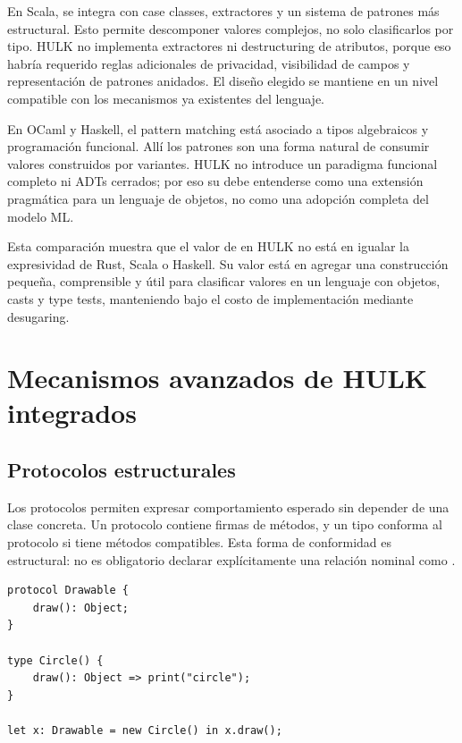 \documentclass[12pt,letterpaper]{article}
\newcommand{\repo}[1]{\texttt{\detokenize{#1}}}
\newcommand{\hulk}{\textsc{HULK}}
\begin{document}
En Scala, \repo{match} se integra con case classes, extractores y un sistema de patrones más estructural. Esto permite descomponer valores complejos, no solo clasificarlos por tipo. \hulk{} no implementa extractores ni destructuring de atributos, porque eso habría requerido reglas adicionales de privacidad, visibilidad de campos y representación de patrones anidados. El diseño elegido se mantiene en un nivel compatible con los mecanismos ya existentes del lenguaje.

En OCaml y Haskell, el pattern matching está asociado a tipos algebraicos y programación funcional. Allí los patrones son una forma natural de consumir valores construidos por variantes. \hulk{} no introduce un paradigma funcional completo ni ADTs cerrados; por eso su \repo{match} debe entenderse como una extensión pragmática para un lenguaje de objetos, no como una adopción completa del modelo ML.

Esta comparación muestra que el valor de \repo{match} en \hulk{} no está en igualar la expresividad de Rust, Scala o Haskell. Su valor está en agregar una construcción pequeña, comprensible y útil para clasificar valores en un lenguaje con objetos, casts y type tests, manteniendo bajo el costo de implementación mediante desugaring.

\section{Mecanismos avanzados de \hulk{} integrados}

\subsection{Protocolos estructurales}

Los protocolos permiten expresar comportamiento esperado sin depender de una clase concreta. Un protocolo contiene firmas de métodos, y un tipo conforma al protocolo si tiene métodos compatibles. Esta forma de conformidad es estructural: no es obligatorio declarar explícitamente una relación nominal como \repo{implements}.

\begin{lstlisting}[language=HULK,caption={Protocolo como contrato de comportamiento}]
protocol Drawable {
    draw(): Object;
}

type Circle() {
    draw(): Object => print("circle");
}

let x: Drawable = new Circle() in x.draw();
\end{lstlisting}
\end{document}

